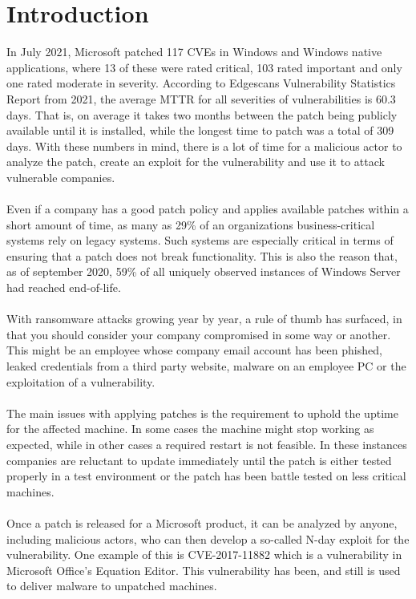\documentclass{report}
\begin{document}
\chapter{Introduction}
\label{cha:introduction}
In July 2021, Microsoft patched 117 CVEs in Windows and Windows native applications\cite{url:patch-tuesday:2021:july}, where 13 of these were rated critical, 103 rated important and only one rated moderate in severity. According to Edgescans Vulnerability Statistics Report from 2021\cite{url:edgescan:2021}, the average \gls{MTTR} for all severities of vulnerabilities is 60.3 days. That is, on average it takes two months between the patch being publicly available until it is installed, while the longest time to patch was a total of 309 days. With these numbers in mind, there is a lot of time for a malicious actor to analyze the patch, create an exploit for the vulnerability and use it to attack vulnerable companies.
\\
\\
Even if a company has a good patch policy and applies available patches within a short amount of time, as many as 29\%\cite{url:legacy-report} of an organizations business-critical systems rely on legacy systems. Such systems are especially critical in terms of ensuring that a patch does not break functionality. This is also the reason that, as of september 2020, 59\% of all uniquely observed instances of Windows Server had reached end-of-life\cite{url:unsupported-report}.
\\
\\
With ransomware attacks growing year by year\cite{url:ransomware-statistics}, a rule of thumb has surfaced, in that you should consider your company compromised in some way or another. This might be an employee whose company email account has been phished, leaked credentials from a third party website, malware on an employee PC or the exploitation of a vulnerability.
\\
\\
The main issues with applying patches is the requirement to uphold the uptime for the affected machine. In some cases the machine might stop working as expected, while in other cases a required restart is not feasible. In these instances companies are reluctant to update immediately until the patch is either tested properly in a test environment or the patch has been battle tested on less critical machines.
\\
\\
Once a patch is released for a Microsoft product, it can be analyzed by anyone, including malicious actors, who can then develop a so-called N-day exploit for the vulnerability. One example of this is CVE-2017-11882\cite{url:n-days} which is a vulnerability in Microsoft Office's Equation Editor. This vulnerability has been, and still is used to deliver malware to unpatched machines.
\end{document}
